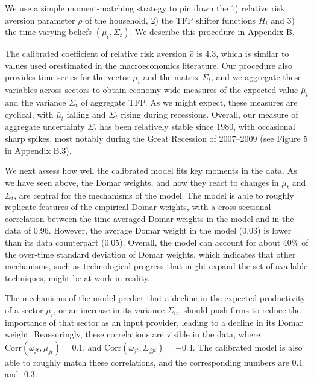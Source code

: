 \documentclass[11pt]{article}
\theoremstyle{definition}
\begin{document}
	We use a simple moment-matching strategy to pin down the 1) relative risk aversion parameter $\rho$ of the household, 2) the TFP shifter functions $\bar{H}_i$ and 3) the time-varying beliefs $(\mu_t, \Sigma_t)$. We describe this procedure in Appendix B.
		
	The calibrated coefficient of relative risk aversion $\hat{\rho}$ is 4.3, which is similar to values used orestimated in the macroeconomics literature. Our procedure also provides time-series for the vector $\mu_t$ and the matrix $\Sigma_t$, and we aggregate these variables across sectors to obtain economy-wide measures of the expected value $\bar{\mu}_t$ and the variance $\bar{\Sigma}_t$ of aggregate TFP. As we might expect, these measures are cyclical, with $\bar{\mu}_t$ falling and $\bar{\Sigma}_t$ rising during recessions. Overall, our measure of aggregate uncertainty $\bar{\Sigma}_t$ has been relatively stable since 1980, with occasional sharp spikes, most notably during the Great Recession of 2007–2009 (see Figure 5 in Appendix B.3).
	
	We next assess how well the calibrated model fits key moments in the data. As we have seen above, the Domar weights, and how they react to changes in $\mu_t$ and $\Sigma_t$, are central for the mechanisms of the model. The model is able to roughly replicate features of the empirical Domar weights, with a cross-sectional correlation between the time-averaged Domar weights in the model and in the data of 0.96. However, the average Domar weight in the model (0.03) is lower than its data counterpart (0.05). Overall, the model can account for about 40\% of the over-time standard deviation of Domar weights, which indicates that other mechanisms, such as technological progress that might expand the set of available techniques, might be at work in reality.
	
	The mechanisms of the model predict that a decline in the expected productivity of a sector $\mu_i$, or an increase in its variance $\Sigma_{ii}$, should push firms to reduce the importance of that sector as an input provider, leading to a decline in its Domar weight. Reassuringly, these correlations are visible in the data, where $\text{Corr}(\omega_{jt},\mu_{jt}) = 0.1$, and $\text{Corr}(\omega_{jt}, \Sigma_{jjt}) = -0.4$. The calibrated model is also able to roughly match these correlations, and the corresponding numbers are 0.1 and -0.3.
	
\end{document}
